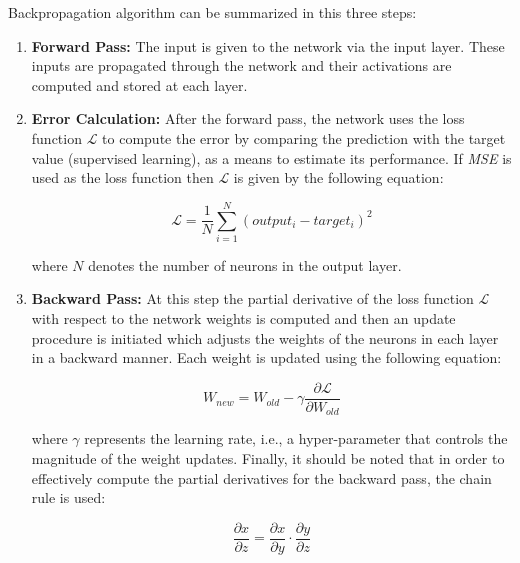 \documentclass[a4paper, 12pt]{article}
\numberwithin{equation}{section}
\numberwithin{figure}{section}
\numberwithin{table}{section}
\begin{document}
	\vspace*{0.5cm}
	
	\noindent Backpropagation algorithm can be summarized in this three steps:
	
	\begin{enumerate}
		\item \textbf{Forward Pass:} The input is given to the network via the input layer. These inputs are propagated through the network and their activations are computed and stored at each layer.
		
		\item \textbf{Error Calculation:} After the forward pass, the network uses the loss function $\mathcal{L}$ to compute the error by comparing the prediction with the target value (supervised learning), as a means to estimate its performance. If \textit{MSE} is used as the loss function then $\mathcal{L}$ is given by the following equation:
		
		\begin{equation}
			\mathcal{L} = \frac{1}{N}\sum_{i=1}^{N}(output_{i} - target_{i})^{2}
		\end{equation}
		
		\noindent where $N$ denotes the number of neurons in the output layer.
		
		\item \textbf{Backward Pass:} At this step the partial derivative of the loss function $\mathcal{L}$ with respect to the network weights is computed and then an update procedure is initiated which adjusts the weights of the neurons in each layer in a backward manner. Each weight is updated using the following equation:
		
		\begin{equation}
			W_{new} = W_{old} - \gamma \frac{\partial \mathcal{L}}{\partial W_{old}}
		\end{equation}
		
		\noindent where $\gamma$ represents the learning rate, i.e., a hyper-parameter that controls the magnitude of the weight updates.
		Finally, it should be noted that in order to effectively compute the partial derivatives for the backward pass, the chain rule is used:
		
		\begin{equation}
			\frac{\partial x}{\partial z} = \frac{\partial x}{\partial y} \cdot \frac{\partial y}{\partial z}
		\end{equation}
		
	\end{enumerate}
	
\end{document}
